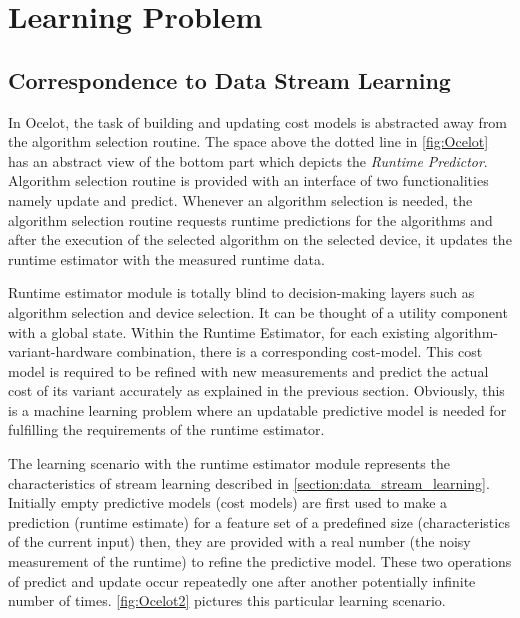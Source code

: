 \section{Learning Problem}

\subsection{Correspondence to Data Stream Learning}

In Ocelot, the task of building and updating cost models is abstracted away from the algorithm selection routine. The space above the dotted line in \ref{fig:Ocelot} has an abstract view of the bottom part which depicts the \textit{Runtime Predictor}. Algorithm selection routine is provided with an interface of two functionalities namely update and predict. Whenever an algorithm selection is needed, the algorithm selection routine requests runtime predictions for the algorithms and after the execution of the selected algorithm on the selected device, it updates the runtime estimator with the measured runtime data. 

Runtime estimator module is totally blind to decision-making layers such as algorithm selection and device selection. It can be thought of a utility component with a global state. Within the Runtime Estimator, for each  existing algorithm-variant-hardware combination, there is a corresponding cost-model. This cost model is required to be refined with new measurements and predict the actual cost of its variant accurately as explained in the previous section. Obviously, this is a machine learning problem where an updatable predictive model is needed for fulfilling the requirements of the runtime estimator.

The learning scenario with the runtime estimator module represents the characteristics of stream learning described in \ref{section:data_stream_learning}. Initially empty predictive models (cost models) are first used to make a prediction (runtime estimate) for a feature set of a predefined size (characteristics of the current input) then, they are provided with a real number (the noisy measurement of the runtime) to refine the predictive model. These two operations of predict and update occur repeatedly one after another potentially infinite number of times. \ref{fig:Ocelot2} pictures this particular learning scenario.

